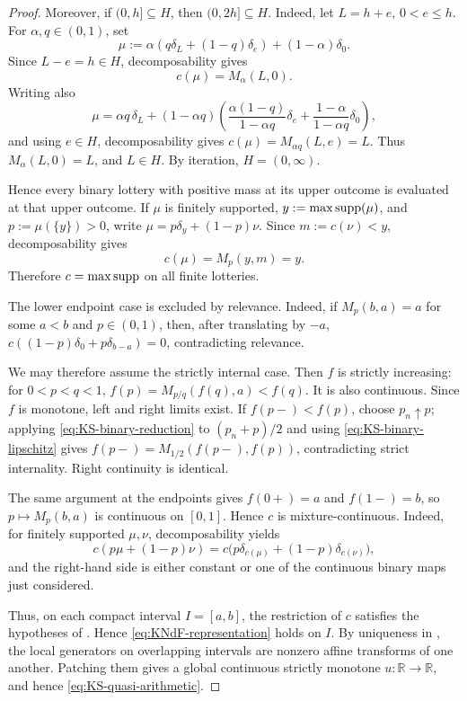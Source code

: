 \documentclass[a4paper]{amsart}
\theoremstyle{definition}
\newcommand{\R}{\mathbb{R}}
\newcommand{\supp}{\textup{supp}}
\renewcommand{\subset}{\subseteq}
\begin{document}
\begin{proof}
Moreover, if \((0,h]\subset H\), then \((0,2h]\subset H\). Indeed, let
\(L=h+e\), \(0<e\le h\). For \(\alpha,q\in(0,1)\), set
\[
\mu:=\alpha(q\delta_L+(1-q)\delta_e)+(1-\alpha)\delta_0 .
\]
Since \(L-e=h\in H\), decomposability gives
\[
c(\mu)=M_\alpha(L,0).
\]
Writing also
\[
\mu=\alpha q\,\delta_L+(1-\alpha q)
\left(
\frac{\alpha(1-q)}{1-\alpha q}\delta_e
+
\frac{1-\alpha}{1-\alpha q}\delta_0
\right),
\]
and using \(e\in H\), decomposability gives \(c(\mu)=M_{\alpha q}(L,e)=L\).
Thus \(M_\alpha(L,0)=L\), and \(L\in H\). By iteration, \(H=(0,\infty)\).

Hence every binary lottery with positive mass at its upper outcome is evaluated
at that upper outcome. If \(\mu\) is finitely supported, \(y:=\max\supp(\mu)\),
and \(p:=\mu(\{y\})>0\), write \(\mu=p\delta_y+(1-p)\nu\). Since
\(m:=c(\nu)<y\), decomposability gives
\[
c(\mu)=M_p(y,m)=y.
\]
Therefore \(c=\max\supp\) on all finite lotteries.


The lower endpoint case is excluded by relevance. Indeed, if \(M_p(b,a)=a\)
for some \(a<b\) and \(p\in(0,1)\), then, after translating by \(-a\),
\(c((1-p)\delta_0+p\delta_{b-a})=0\), contradicting relevance.

We may therefore assume the strictly internal case. Then \(f\) is strictly
increasing: for \(0<p<q<1\),
\(f(p)=M_{p/q}(f(q),a)<f(q)\). It is also continuous. Since \(f\) is monotone,
left and right limits exist. If \(f(p-)<f(p)\), choose \(p_n\uparrow p\);
applying \eqref{eq:KS-binary-reduction} to \((p_n+p)/2\) and using
\eqref{eq:KS-binary-lipschitz} gives
\(f(p-)=M_{1/2}(f(p-),f(p))\), contradicting strict internality. Right
continuity is identical.


The same argument at the endpoints gives \(f(0+)=a\) and \(f(1-)=b\), so
\(p\mapsto M_p(b,a)\) is continuous on \([0,1]\). Hence \(c\) is
mixture-continuous. Indeed, for finitely supported \(\mu,\nu\),
decomposability yields
\[
c(p\mu+(1-p)\nu)
=
c\bigl(p\delta_{c(\mu)}+(1-p)\delta_{c(\nu)}\bigr),
\]
and the right-hand side is either constant or one of the continuous binary
maps just considered.

Thus, on each compact interval \(I=[a,b]\), the restriction of \(c\) satisfies
the hypotheses of . Hence
\eqref{eq:KNdF-representation} holds on \(I\). By uniqueness in
, the local generators on overlapping intervals
are nonzero affine transforms of one another. Patching them gives a global
continuous strictly monotone \(u:\R\to\R\), and hence
\eqref{eq:KS-quasi-arithmetic}.
\end{proof}
\end{document}
